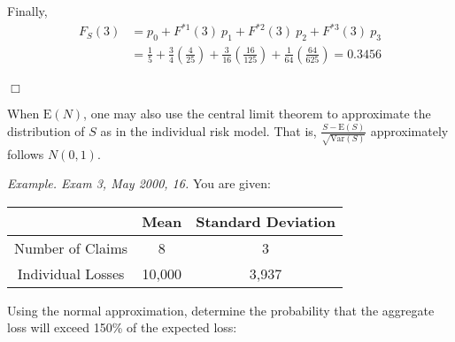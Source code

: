 \documentclass[12pt,letterpaper]{article}
\begin{document}
Finally,
\begin{align*}
F_{S}(3) &= p_0 + F^{\ast 1}(3) \ p_1 + F^{\ast 2}(3) \ p_2 + F^{\ast 3}(3) \ p_3 \\
&= \frac{1}{5} + \frac{3}{4}\left(\frac{4}{25} \right) + \frac{3}{16} \left( \frac{16}{125} \right) + \frac{1}{64} \left( \frac{64}{625}\right) = 0.3456\\
\end{align*}
\begin{flushright}$\Box$\end{flushright}

\bigskip



When $\mathrm{E}(N)$, one may also use the central limit theorem to approximate the distribution of $S$ as in the individual risk model. That is, $\frac{S - \mathrm{E}(S)}{\sqrt{\mathrm{Var}(S)}}$ approximately follows $N(0,1)$.

\bigskip


\noindent \textit{Example. Exam 3, May 2000, 16.} You are given:

\begin{center}
  \begin{tabular}{ c | c  c }
    \hline
      & Mean & Standard Deviation\\ \hline
    Number of Claims & 8 & 3\\
    Individual Losses & 10,000 & 3,937\\
    \hline
  \end{tabular}
\end{center}
Using the normal approximation, determine the probability that the aggregate loss will exceed 150\% of the expected loss:
\end{document}
